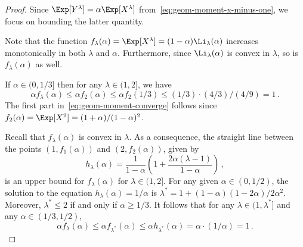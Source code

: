 \begin{proof}
    Since $\Exp[Y^\lambda] = \alpha \Exp[X^\lambda]$ from~\eqref{eq:geom-moment-x-minus-one}, 
    we focus on bounding the latter quantity. 

    Note that the function $f_\lambda(\alpha) = \Exp[X^\lambda] = (1 - \alpha) \Li_{\lambda}(\alpha)$ 
    increases monotonically in both $\lambda$ and $\alpha$. 
    Furthermore, since $\Li_{\lambda}(\alpha)$ is convex in $\lambda$, 
    so is $f_\lambda(\alpha)$ as well.

    If $\alpha \in (0, 1/3]$ 
    then for any $\lambda \in (1, 2]$, 
    we have 
    $$
    \alpha f_\lambda(\alpha) 
    \leq \alpha f_2(\alpha) 
    \leq \alpha f_2(1/3) 
    \leq (1/3) \cdot (4/3)/(4/9) 
    = 1
    \,.
    $$ 
    The first part in~\eqref{eq:geom-moment-converge} 
    follows since $f_2(\alpha) = \Exp[X^2] = (1+\alpha)/(1 - \alpha)^2$. 

    Recall that $f_\lambda(\alpha)$ is convex in $\lambda$. 
    As a consequence, the straight line between the points 
    $(1, f_1(\alpha))$ and $(2, f_2(\alpha))$, given by 
    $$
        h_\lambda(\alpha) 
        = \frac{1}{1-\alpha}\left( 1 + \frac{2 \alpha (\lambda - 1)}{1-\alpha}\right)
        \,,
    $$
    is an upper bound for $f_\lambda(\alpha)$ 
    for $\lambda \in (1, 2]$. 
    For any given $\alpha \in (0, 1/2)$, 
    the solution to the equation $h_\lambda(\alpha) = 1/\alpha$ 
    is $\lambda^* = 1 + (1- \alpha)(1 - 2 \alpha)/2 \alpha^2$. 
    Moreover, $\lambda^* \leq 2$ if and only if $\alpha \geq 1/3$.
    It follows that for any $\lambda \in (1, \lambda^*]$ 
    and any $\alpha \in (1/3, 1/2)$, 
    $$
        \alpha f_\lambda(\alpha)
        \leq \alpha f_{\lambda^*}(\alpha)
        \leq \alpha h_{\lambda^*}(\alpha)
        =  \alpha \cdot (1/\alpha)
        = 1
        \,.
    $$
\end{proof}

